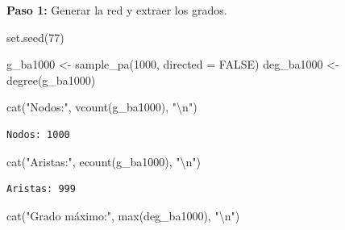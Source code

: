 \documentclass[
  letterpaper,
  DIV=11,
  numbers=noendperiod]{scrreprt}
\newenvironment{Shaded}{\begin{snugshade}}{\end{snugshade}}
\newcommand{\AttributeTok}[1]{\textcolor[rgb]{0.40,0.45,0.13}{#1}}
\newcommand{\ConstantTok}[1]{\textcolor[rgb]{0.56,0.35,0.01}{#1}}
\newcommand{\DecValTok}[1]{\textcolor[rgb]{0.68,0.00,0.00}{#1}}
\newcommand{\FunctionTok}[1]{\textcolor[rgb]{0.28,0.35,0.67}{#1}}
\newcommand{\NormalTok}[1]{\textcolor[rgb]{0.00,0.23,0.31}{#1}}
\newcommand{\OtherTok}[1]{\textcolor[rgb]{0.00,0.23,0.31}{#1}}
\newcommand{\SpecialCharTok}[1]{\textcolor[rgb]{0.37,0.37,0.37}{#1}}
\newcommand{\StringTok}[1]{\textcolor[rgb]{0.13,0.47,0.30}{#1}}
\begin{document}
\begin{tcolorbox}[enhanced jigsaw, toprule=.15mm, colframe=quarto-callout-tip-color-frame, coltitle=black, titlerule=0mm, colback=white, breakable, leftrule=.75mm, arc=.35mm, bottomtitle=1mm, toptitle=1mm, rightrule=.15mm, bottomrule=.15mm, left=2mm, title=\textcolor{quarto-callout-tip-color}{\faLightbulb}\hspace{0.5em}{📝 Solución}, colbacktitle=quarto-callout-tip-color!10!white, opacityback=0, opacitybacktitle=0.6]

\textbf{Paso 1:} Generar la red y extraer los grados.

\begin{Shaded}
\begin{Highlighting}[]
\FunctionTok{set.seed}\NormalTok{(}\DecValTok{77}\NormalTok{)}

\NormalTok{g\_ba1000 }\OtherTok{\textless{}{-}} \FunctionTok{sample\_pa}\NormalTok{(}\DecValTok{1000}\NormalTok{, }\AttributeTok{directed =} \ConstantTok{FALSE}\NormalTok{)}
\NormalTok{deg\_ba1000 }\OtherTok{\textless{}{-}} \FunctionTok{degree}\NormalTok{(g\_ba1000)}

\FunctionTok{cat}\NormalTok{(}\StringTok{"Nodos:"}\NormalTok{, }\FunctionTok{vcount}\NormalTok{(g\_ba1000), }\StringTok{"}\SpecialCharTok{\textbackslash{}n}\StringTok{"}\NormalTok{)}
\end{Highlighting}
\end{Shaded}

\begin{verbatim}
Nodos: 1000 
\end{verbatim}

\begin{Shaded}
\begin{Highlighting}[]
\FunctionTok{cat}\NormalTok{(}\StringTok{"Aristas:"}\NormalTok{, }\FunctionTok{ecount}\NormalTok{(g\_ba1000), }\StringTok{"}\SpecialCharTok{\textbackslash{}n}\StringTok{"}\NormalTok{)}
\end{Highlighting}
\end{Shaded}

\begin{verbatim}
Aristas: 999 
\end{verbatim}

\begin{Shaded}
\begin{Highlighting}[]
\FunctionTok{cat}\NormalTok{(}\StringTok{"Grado máximo:"}\NormalTok{, }\FunctionTok{max}\NormalTok{(deg\_ba1000), }\StringTok{"}\SpecialCharTok{\textbackslash{}n}\StringTok{"}\NormalTok{)}
\end{Highlighting}
\end{Shaded}


\end{tcolorbox}
\end{document}
